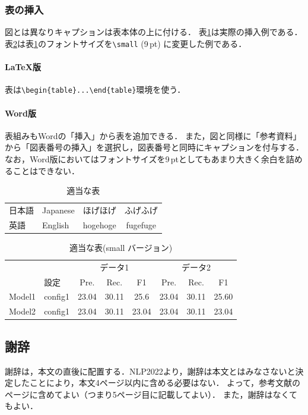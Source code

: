 \documentclass[
  platex, dvipdfmx,  %
]{nlp2026}
\begin{document}
\subsubsection{表の挿入}
図とは異なりキャプションは表本体の上に付ける．
表\ref{tab:sample1}は実際の挿入例である．
表\ref{tab:sample2}は表\ref{tab:sample1}のフォントサイズを\verb|\small| (9\,pt) に変更した例である．



\paragraph{LaTeX版}
表は\verb|\begin{table}...\end{table}|環境を使う．

\paragraph{Word版}
表組みもWordの「挿入」から表を追加できる．
また，図と同様に「参考資料」から「図表番号の挿入」を選択し，図表番号と同時にキャプションを付与する．
なお，Word版においてはフォントサイズを9\,ptとしてもあまり大きく余白を詰めることはできない．

\begin{table}[t]
\centering
\caption{適当な表}
\label{tab:sample1}
\begin{tabular}{llcc}
\hline
日本語 & Japanese & ほげほげ & ふげふげ\\
英語 & English & hogehoge & fugefuge\\
\hline
\end{tabular}
\end{table}
%
\begin{table}[t]
\centering
\small
\tabcolsep 3pt
\caption{適当な表(small バージョン)}
\label{tab:sample2}
\begin{tabular}{llcccccc}
\hline
\      &      &\multicolumn{3}{c}{データ1}&\multicolumn{3}{c}{データ2}\\
\      & 設定 & Pre. & Rec. &F1 & Pre. & Rec. &F1\\
\hline
Model1 & config1 & 23.04 & 30.11 &  25.6 & 23.04 & 30.11 & 25.60\\
Model2 & config1 & 23.04 & 30.11 & 23.04 & 23.04 & 30.11 & 23.04 \\
\hline
\end{tabular}
\end{table}




\subsection{謝辞}
謝辞は，本文の直後に配置する．NLP2022より，謝辞は本文とはみなさないと決定したことにより，本文4ページ以内に含める必要はない．
よって，参考文献のページに含めてよい（つまり5ページ目に記載してよい）．
また，謝辞はなくてもよい．
\end{document}
